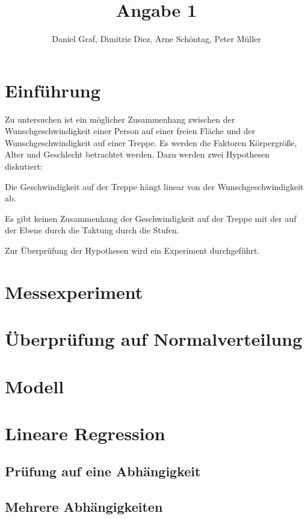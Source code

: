 
 
\title{Angabe 1}
\providecommand{\subtitle}[1]{}
\subtitle{Untertitel}
\author{Daniel Graf, Dimitrie Diez, Arne Schöntag, Peter Müller}
\date{}


\maketitle


\tableofcontents

\section{Einführung}
Zu untersuchen ist ein möglicher Zusammenhang zwischen der Wunschgeschwindigkeit einer Person auf einer freien Fläche und der Wunschgeschwindigkeit auf einer Treppe. Es werden die Faktoren Körpergröße, Alter und Geschlecht betrachtet werden.
Dazu werden zwei Hypothesen diskutiert:
\begin{list}{-}{}
	\item Die Geschwindigkeit auf der Treppe hängt linear von der Wunschgeschwindigkeit ab.
	\item Es gibt keinen Zusammenhang der Geschwindigkeit auf der Treppe mit der auf der Ebene durch die Taktung durch die Stufen.
\end{list}
 
Zur Überprüfung der Hypothesen wird ein Experiment durchgeführt.

\section{Messexperiment}
\section{Überprüfung auf Normalverteilung}
\section{Modell}
\section{Lineare Regression}
\subsection{Prüfung auf eine Abhängigkeit}
\subsection{Mehrere Abhängigkeiten}
